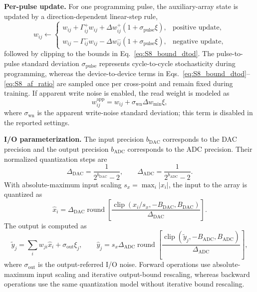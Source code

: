 \documentclass[AMA,LATO1COL]{WileyNJDv5}
\begin{document}
\noindent\textbf{Per-pulse update.}
For one programming pulse, the auxiliary-array state is updated by a direction-dependent linear-step rule,
\begin{equation}
w_{ij}\leftarrow
\begin{cases}
w_{ij}
+
\Gamma^{+}_{ij}w_{ij}
+
\Delta w^{+}_{ij}\left(1+\sigma_{\mathrm{pulse}}\xi\right),
& \text{positive update},\\[4pt]
w_{ij}
-
\Gamma^{-}_{ij}w_{ij}
-
\Delta w^{-}_{ij}\left(1+\sigma_{\mathrm{pulse}}\xi\right),
& \text{negative update},
\end{cases}
\label{eq:S8_per_pulse_update}
\end{equation}
followed by clipping to the bounds in Eq.~\eqref{eq:S8_bound_dtod}. The pulse-to-pulse standard deviation \(\sigma_{\mathrm{pulse}}\) represents cycle-to-cycle stochasticity during programming, whereas the device-to-device terms in Eqs.~\eqref{eq:S8_bound_dtod}--\eqref{eq:S8_af_ratio} are sampled once per cross-point and remain fixed during training. If apparent write noise is enabled, the read weight is modeled as
\begin{equation}
w^{\mathrm{app}}_{ij}
=
w_{ij}
+
\sigma_{\mathrm{wn}}\Delta w_{\min}\xi ,
\label{eq:S8_write_noise}
\end{equation}
where \(\sigma_{\mathrm{wn}}\) is the apparent write-noise standard deviation; this term is disabled in the reported settings.

\noindent\textbf{I/O parameterization.}
The input precision \(b_{\mathrm{DAC}}\) corresponds to the DAC precision and the output precision \(b_{\mathrm{ADC}}\) corresponds to the ADC precision. Their normalized quantization steps are
\begin{equation}
\Delta_{\mathrm{DAC}}=\frac{1}{2^{b_{\mathrm{DAC}}}-2},
\qquad
\Delta_{\mathrm{ADC}}=\frac{1}{2^{b_{\mathrm{ADC}}}-2}.
\label{eq:S8_io_resolution}
\end{equation}
With absolute-maximum input scaling \(s_x=\max_i|x_i|\), the input to the array is quantized as
\begin{equation}
\hat{x}_i
=
\Delta_{\mathrm{DAC}}
\operatorname{round}
\left[
\frac{\operatorname{clip}(x_i/s_x,-B_{\mathrm{DAC}},B_{\mathrm{DAC}})}
{\Delta_{\mathrm{DAC}}}
\right].
\label{eq:S8_input_quant}
\end{equation}
The output is computed as
\begin{equation}
\tilde{y}_j
=
\sum_i w_{ji}\hat{x}_i
+
\sigma_{\mathrm{out}}\xi_j,
\qquad
\hat{y}_j
=
s_x\Delta_{\mathrm{ADC}}
\operatorname{round}
\left[
\frac{\operatorname{clip}(\tilde{y}_j,-B_{\mathrm{ADC}},B_{\mathrm{ADC}})}
{\Delta_{\mathrm{ADC}}}
\right],
\label{eq:S8_output_quant}
\end{equation}
where \(\sigma_{\mathrm{out}}\) is the output-referred I/O noise. Forward operations use absolute-maximum input scaling and iterative output-bound rescaling, whereas backward operations use the same quantization model without iterative bound rescaling.
\end{document}
